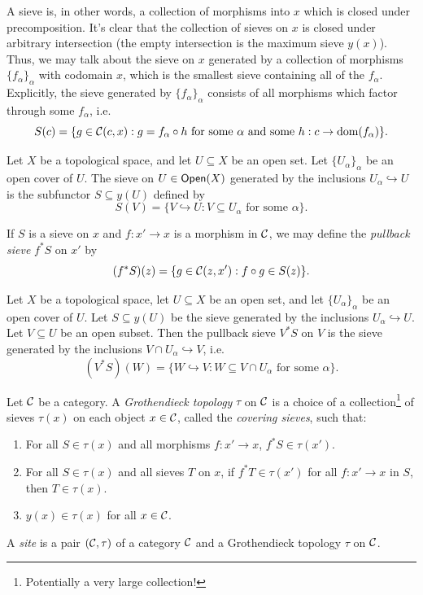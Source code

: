 A sieve is, in other words, a collection of morphisms into $x$ which is closed under precomposition. It's clear that the collection of sieves on $x$ is closed under arbitrary intersection (the empty intersection is the maximum sieve $y(x)$). Thus, we may talk about the sieve on $x$ generated by a collection of morphisms $\{f_\alpha\}_\alpha$ with codomain $x$, which is the smallest sieve containing all of the $f_\alpha$. Explicitly, the sieve generated by $\{f_\alpha\}_\alpha$ consists of all morphisms which factor through some $f_\alpha$, i.e.
\[S(c) = \{g \in \mathcal{C}(c,x) : g = f_\alpha \circ h \text{ for some } \alpha \text{ and some }h : c \to \operatorname{dom}(f_\alpha)\}.\]

\begin{example}\label{example:chap:sheaves:sec:sites:sieve generated by open cover}
    Let $X$ be a topological space, and let $U \subseteq X$ be an open set. Let $\{U_\alpha\}_\alpha$ be an open cover of $U$. The sieve on $U \in \mathsf{Open}(X)$ generated by the inclusions $U_\alpha \hookrightarrow U$ is the subfunctor $S \subseteq y(U)$ defined by
    \[S(V) = \{V \hookrightarrow U : V \subseteq U_\alpha \text{ for some } \alpha\}.\]
\end{example}

If $S$ is a sieve on $x$ and $f : x' \to x$ is a morphism in $\mathcal{C}$, we may define the \emph{pullback sieve} $f^* S$ on $x'$ by
\[(f^* S)(z) = \{g \in \mathcal{C}(z,x') : f \circ g \in S(z)\}.\]

\begin{example}\label{example:chap:sheaves:sec:sites:pullback of sieve generated by open cover}
    Let $X$ be a topological space, let $U \subseteq X$ be an open set, and let $\{U_\alpha\}_\alpha$ be an open cover of $U$. Let $S \subseteq y(U)$ be the sieve generated by the inclusions $U_\alpha \hookrightarrow U$. Let $V \subseteq U$ be an open subset. Then the pullback sieve $V^* S$ on $V$ is the sieve generated by the inclusions $V \cap U_\alpha \hookrightarrow V$, i.e.
    \[(V^* S)(W) = \{W \hookrightarrow V : W \subseteq V \cap U_\alpha \text{ for some } \alpha\}.\]
\end{example}

\begin{definition}\label{def:chap:sheaves:sec:sites:grothendieck topology}
    Let $\mathcal{C}$ be a category. A \emph{Grothendieck topology} $\tau$ on $\mathcal{C}$ is a choice of a collection\footnote{Potentially a very large collection!} of sieves $\tau(x)$ on each object $x \in \mathcal{C}$, called the \emph{covering sieves}, such that:
    \begin{enumerate}[label=(T\arabic*)]
        \item For all $S \in \tau(x)$ and all morphisms $f : x' \to x$, $f^* S \in \tau(x')$.
        \item For all $S \in \tau(x)$ and all sieves $T$ on $x$, if $f^* T \in \tau(x')$ for all $f : x' \to x$ in $S$, then $T \in \tau(x)$.
        \item $y(x) \in \tau(x)$ for all $x \in \mathcal{C}$.
    \end{enumerate}
    A \emph{site} is a pair $(\mathcal{C}, \tau)$ of a category $\mathcal{C}$ and a Grothendieck topology $\tau$ on $\mathcal{C}$.
\end{definition}

